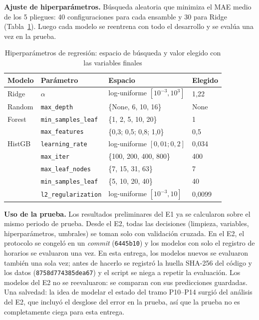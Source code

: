 \documentclass[conference,spanish]{IEEEtran}
\begin{document}
\textbf{Ajuste de hiperparámetros.} Búsqueda aleatoria que minimiza el MAE medio de los 5 pliegues: 40 configuraciones para cada ensamble y 30 para Ridge (Tabla~\ref{tab:hiper}). Luego cada modelo se reentrena con todo el desarrollo y se evalúa una vez en la prueba.

\begin{table}[h]
\centering
\caption{Hiperparámetros de regresión: espacio de búsqueda y valor elegido con las variables finales}
\label{tab:hiper}
\scriptsize
\begin{tabular}{@{}p{1.1cm}p{2.8cm}p{2.6cm}p{0.9cm}@{}}
\toprule
\textbf{Modelo} & \textbf{Parámetro} & \textbf{Espacio} & \textbf{Elegido}\\
\midrule
Ridge & $\alpha$ & log-uniforme $[10^{-3},10^{3}]$ & 1,22\\
\midrule
Random & \texttt{max\_depth} & \{None, 6, 10, 16\} & None\\
Forest & \texttt{min\_samples\_leaf} & \{1, 2, 5, 10, 20\} & 1\\
 & \texttt{max\_features} & \{0,3; 0,5; 0,8; 1,0\} & 0,5\\
\midrule
HistGB & \texttt{learning\_rate} & log-uniforme $[0{,}01;0{,}2]$ & 0,034\\
 & \texttt{max\_iter} & \{100, 200, 400, 800\} & 400\\
 & \texttt{max\_leaf\_nodes} & \{7, 15, 31, 63\} & 7\\
 & \texttt{min\_samples\_leaf} & \{5, 10, 20, 40\} & 40\\
 & \texttt{l2\_regularization} & log-uniforme $[10^{-3},10]$ & 0,0099\\
\bottomrule
\end{tabular}
\end{table}

\textbf{Uso de la prueba.} Los resultados preliminares del E1 ya se calcularon sobre el mismo periodo de prueba. Desde el E2, todas las decisiones (limpieza, variables, hiperparámetros, umbrales) se toman solo con validación cruzada. En el E2, el protocolo se congeló en un \textit{commit} (\texttt{6445b10}) y los modelos con solo el registro de horarios se evaluaron una vez. En esta entrega, los modelos nuevos se evaluaron también una sola vez; antes de hacerlo se registró la huella SHA-256 del código y los datos (\texttt{8758d774385dea67}) y el script se niega a repetir la evaluación. Los modelos del E2 no se reevaluaron: se comparan con sus predicciones guardadas. Una salvedad: la idea de modelar el estado del tramo P10--P14 surgió del análisis del E2, que incluyó el desglose del error en la prueba, así que la prueba no es completamente ciega para esta entrega.
\end{document}
